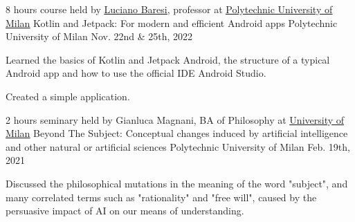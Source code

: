 \begin{cventries}
  \cventry
    {8 hours course held by \underline{\href{https://www.linkedin.com/in/luciano-baresi-5a867a1/}{Luciano Baresi}}, professor at \underline{\href{https://www.polimi.it/en/}{Polytechnic University of Milan}}} %
    {Kotlin and Jetpack: For modern and efficient Android apps} %
    {Polytechnic University of Milan} %
    {Nov. 22nd \& 25th, 2022} %
    {
      \begin{cvitems} %
        \item {Learned the basics of Kotlin and Jetpack Android, the structure of a typical Android app and how to use the official IDE Android Studio.}
        \item {Created a simple application.}
      \end{cvitems}
    }

  \cventry
    {2 hours seminary held by Gianluca Magnani, BA of Philosophy at \underline{\href{https://www.unimi.it/en}{University of Milan}}} %
    {Beyond The Subject: Conceptual changes induced by artificial intelligence and other natural or artificial sciences} %
    {Polytechnic University of Milan} %
    {Feb. 19th, 2021} %
    {
      \begin{cvitems} %
        \item {Discussed the philosophical mutations in the meaning of the word "subject", and many correlated terms such as "rationality" and "free will", caused by the persuasive impact of AI on our means of understanding.}
      \end{cvitems}
    }

\end{cventries}
